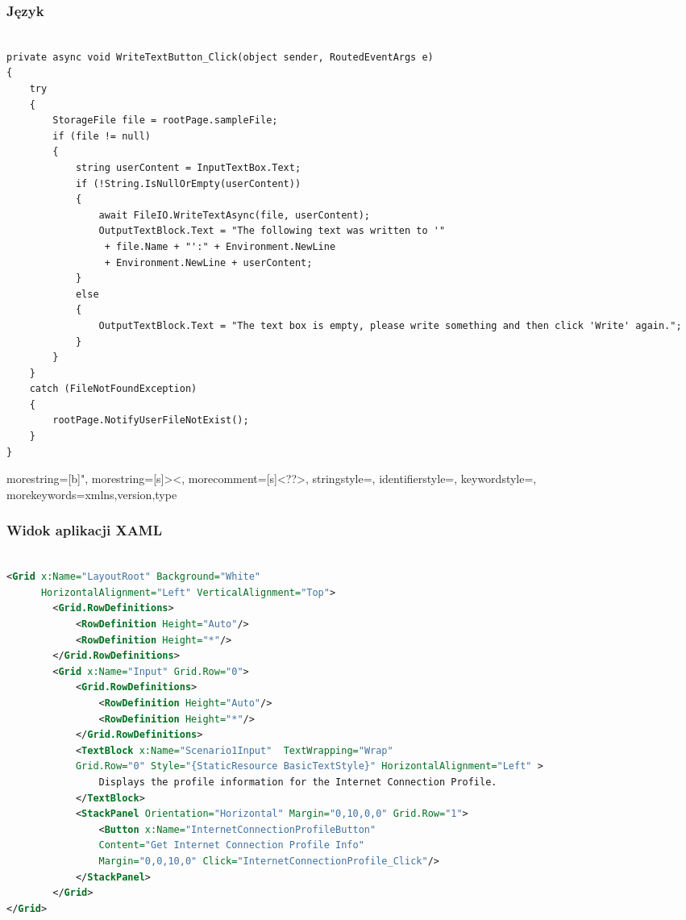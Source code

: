 \begin{frame}[fragile]
\frametitle{Język \Csharp}
 \begin{adjustbox}{width=\textwidth}
\begin{lstlisting}[language=CSharp,basicstyle=\ttfamily]

private async void WriteTextButton_Click(object sender, RoutedEventArgs e) 
{ 
    try 
    {         
        StorageFile file = rootPage.sampleFile; 
        if (file != null) 
        { 
            string userContent = InputTextBox.Text; 
            if (!String.IsNullOrEmpty(userContent)) 
            { 
                await FileIO.WriteTextAsync(file, userContent); 
                OutputTextBlock.Text = "The following text was written to '"
                 + file.Name + "':" + Environment.NewLine 
                 + Environment.NewLine + userContent; 
            } 
            else 
            { 
                OutputTextBlock.Text = "The text box is empty, please write something and then click 'Write' again."; 
            } 
        } 
    } 
    catch (FileNotFoundException) 
    { 
        rootPage.NotifyUserFileNotExist(); 
    } 
} 
\end{lstlisting}
\end{adjustbox}
\end{frame}



{
  morestring=[b]",
  morestring=[s]{>}{<},
  morecomment=[s]{<?}{?>},
  stringstyle=\color{black},
  identifierstyle=\color{darkblue},
  keywordstyle=\color{cyan},
  morekeywords={xmlns,version,type}%
}

\begin{frame}[fragile]
\frametitle{Widok aplikacji XAML}
 \begin{adjustbox}{width=\textwidth}
\begin{lstlisting}[language=XML,basicstyle=\ttfamily]

<Grid x:Name="LayoutRoot" Background="White" 
      HorizontalAlignment="Left" VerticalAlignment="Top"> 
        <Grid.RowDefinitions> 
            <RowDefinition Height="Auto"/> 
            <RowDefinition Height="*"/> 
        </Grid.RowDefinitions> 
        <Grid x:Name="Input" Grid.Row="0"> 
            <Grid.RowDefinitions> 
                <RowDefinition Height="Auto"/> 
                <RowDefinition Height="*"/> 
            </Grid.RowDefinitions> 
            <TextBlock x:Name="Scenario1Input"  TextWrapping="Wrap" 
            Grid.Row="0" Style="{StaticResource BasicTextStyle}" HorizontalAlignment="Left" > 
                Displays the profile information for the Internet Connection Profile. 
            </TextBlock> 
            <StackPanel Orientation="Horizontal" Margin="0,10,0,0" Grid.Row="1"> 
                <Button x:Name="InternetConnectionProfileButton" 
                Content="Get Internet Connection Profile Info" 
                Margin="0,0,10,0" Click="InternetConnectionProfile_Click"/> 
            </StackPanel> 
        </Grid> 
</Grid> 
\end{lstlisting}
\end{adjustbox}
\end{frame}



